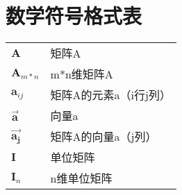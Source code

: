 \section*{数学符号格式表}
\centering
\begin{tabular}{ll}
\hline
$\mathbf{A}$ & 矩阵A \\
$\mathbf{A}_{m*n}$ & m*n维矩阵A \\
$\mathbf{a}_{ij}$ & 矩阵A的元素a（i行j列） \\
$\mathbf{\vec{a}}$ & 向量a \\
$\mathbf{\vec{a_{j}}}$ & 矩阵A的向量a（j列） \\
$\mathbf{I}$ & 单位矩阵 \\
$\mathbf{I}_{n}$ & n维单位矩阵 \\
\hline
\end{tabular}